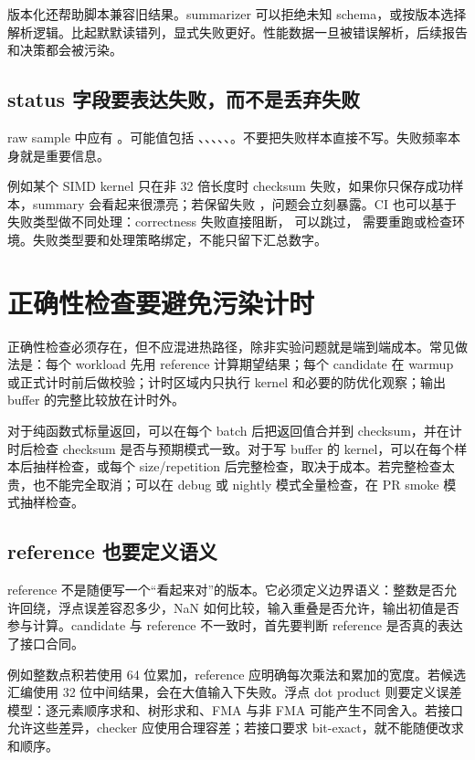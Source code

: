 版本化还帮助脚本兼容旧结果。summarizer 可以拒绝未知 schema，或按版本选择解析逻辑。比起默默读错列，显式失败更好。性能数据一旦被错误解析，后续报告和决策都会被污染。

\subsection{status 字段要表达失败，而不是丢弃失败}

raw sample 中应有 。可能值包括 、、、、、。不要把失败样本直接不写。失败频率本身就是重要信息。

例如某个 SIMD kernel 只在非 32 倍长度时 checksum 失败，如果你只保存成功样本，summary 会看起来很漂亮；若保留失败 ，问题会立刻暴露。CI 也可以基于失败类型做不同处理：correctness 失败直接阻断， 可以跳过， 需要重跑或检查环境。失败类型要和处理策略绑定，不能只留下汇总数字。

\section{正确性检查要避免污染计时}

正确性检查必须存在，但不应混进热路径，除非实验问题就是端到端成本。常见做法是：每个 workload 先用 reference 计算期望结果；每个 candidate 在 warmup 或正式计时前后做校验；计时区域内只执行 kernel 和必要的防优化观察；输出 buffer 的完整比较放在计时外。

对于纯函数式标量返回，可以在每个 batch 后把返回值合并到 checksum，并在计时后检查 checksum 是否与预期模式一致。对于写 buffer 的 kernel，可以在每个样本后抽样检查，或每个 size/repetition 后完整检查，取决于成本。若完整检查太贵，也不能完全取消；可以在 debug 或 nightly 模式全量检查，在 PR smoke 模式抽样检查。

\subsection{reference 也要定义语义}

reference 不是随便写一个“看起来对”的版本。它必须定义边界语义：整数是否允许回绕，浮点误差容忍多少，NaN 如何比较，输入重叠是否允许，输出初值是否参与计算。candidate 与 reference 不一致时，首先要判断 reference 是否真的表达了接口合同。

例如整数点积若使用 64 位累加，reference 应明确每次乘法和累加的宽度。若候选汇编使用 32 位中间结果，会在大值输入下失败。浮点 dot product 则要定义误差模型：逐元素顺序求和、树形求和、FMA 与非 FMA 可能产生不同舍入。若接口允许这些差异，checker 应使用合理容差；若接口要求 bit-exact，就不能随便改求和顺序。

